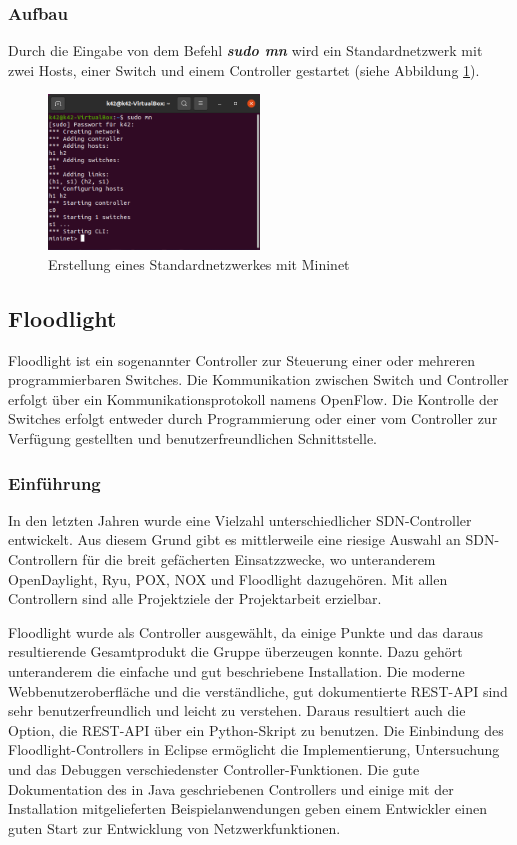\documentclass[fontsize=12pt,paper=a4,open=any,parskip=half,
  twoside=false,toc=listof,toc=bibliography,fleqn,leqno,
  captions=nooneline,captions=tableabove,british]{scrbook}
\begin{document}
\subsubsection{Aufbau}
Durch die Eingabe von dem Befehl \textit{\textbf{sudo mn}} wird ein Standardnetzwerk mit zwei Hosts, einer Switch und einem Controller gestartet (siehe Abbildung \ref{sudomn}).

\begin{figure}[htbp]
 \centering
 \includegraphics[width=0.5\textwidth]{Bilder/sudomn}
 \captionsetup{justification=centering,margin=2cm}
 \caption{Erstellung eines Standardnetzwerkes mit Mininet}
 \label{sudomn}
\end{figure}

\subsection{Floodlight}
Floodlight ist ein sogenannter Controller zur Steuerung einer oder mehreren programmierbaren Switches. Die Kommunikation zwischen Switch und Controller erfolgt über ein Kommunikationsprotokoll namens OpenFlow. Die Kontrolle der Switches erfolgt entweder durch Programmierung oder einer vom Controller zur Verfügung gestellten und benutzerfreundlichen Schnittstelle.

\subsubsection{Einführung}
In den letzten Jahren wurde eine Vielzahl unterschiedlicher SDN-Controller entwickelt. Aus diesem Grund gibt es mittlerweile eine riesige Auswahl an SDN-Controllern für die breit gefächerten Einsatzzwecke, wo unteranderem OpenDaylight, Ryu, POX, NOX und Floodlight dazugehören. Mit allen Controllern sind alle Projektziele der Projektarbeit erzielbar.\par
Floodlight wurde als Controller ausgewählt, da einige Punkte und das daraus resultierende Gesamtprodukt die Gruppe überzeugen konnte. Dazu gehört unteranderem die einfache und gut beschriebene Installation. Die moderne Webbenutzeroberfläche und die verständliche, gut dokumentierte REST-API sind sehr benutzerfreundlich und leicht zu verstehen. Daraus resultiert auch die Option, die REST-API über ein Python-Skript zu benutzen. Die Einbindung des Floodlight-Controllers in Eclipse ermöglicht die Implementierung, Untersuchung und das Debuggen verschiedenster Controller-Funktionen. Die gute Dokumentation des in Java geschriebenen Controllers und einige mit der Installation mitgelieferten Beispielanwendungen geben einem Entwickler einen guten Start zur Entwicklung von Netzwerkfunktionen.
\end{document}
